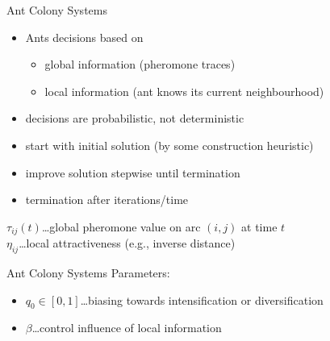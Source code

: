 \begin{frame}{Ant Colony Systems}
  \begin{itemize}
    \item Ants decisions based on 
    \begin{itemize}
      \item global information (pheromone traces)
      \item local information (ant knows its current neighbourhood)
    \end{itemize}
    \item decisions are probabilistic, not deterministic
    \item start with initial solution (by some construction heuristic)
    \item improve solution stepwise until termination
    \item termination after iterations/time
  \end{itemize}

  \begin{Definition}
    $\tau_{ij}(t)$\dots global pheromone value on arc $(i,j)$ at time $t$ \\ 
    $\eta_{ij}$\dots local attractiveness (e.g., inverse distance)
  \end{Definition}

\end{frame}

\begin{frame}{Ant Colony Systems}
  Parameters:
  \begin{itemize}
    \item $q_0 \in [0,1]$\dots biasing towards intensification or diversification
    \item $\beta$\dots control influence of local information
  \end{itemize}
  \vspace{5pt}
\end{frame}

